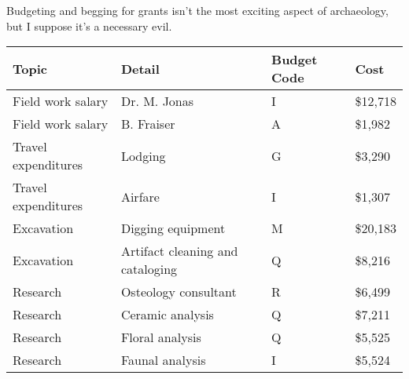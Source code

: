 {\LARGE\normalfont\wedn
Budgeting and begging for grants isn't the most exciting aspect of
archaeology, but I suppose it's a necessary evil.

\normalsize
\begin{center}
\begin{tabular}{llll}
\textbf{Topic}      & \textbf{Detail}                  & \textbf{Budget Code} & \textbf{Cost}     \\\hline
Field work salary   & Dr. M. Jonas                     & I           & \$12,718 \\
Field work salary   & B. Fraiser                       & A           & \$1,982  \\
Travel expenditures & Lodging                          & G           & \$3,290  \\
Travel expenditures & Airfare                          & I           & \$1,307  \\
Excavation          & Digging equipment                & M           & \$20,183 \\
Excavation          & Artifact cleaning and cataloging & Q           & \$8,216  \\
Research            & Osteology consultant             & R           & \$6,499  \\
Research            & Ceramic analysis                 & Q           & \$7,211  \\
Research            & Floral analysis                  & Q           & \$5,525  \\
Research            & Faunal analysis                  & I           & \$5,524 
\end{tabular}
\end{center}
}

